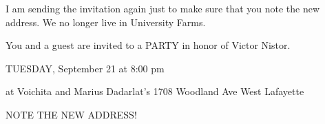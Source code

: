 I am sending the invitation again
just to make sure that you note the new address.
We no longer live in University Farms.

You and a guest are invited to a PARTY
in honor of Victor Nistor.

TUESDAY, September 21 at 8:00 pm

at Voichita and Marius Dadarlat's
1708 Woodland Ave
West Lafayette

NOTE THE NEW ADDRESS! 
